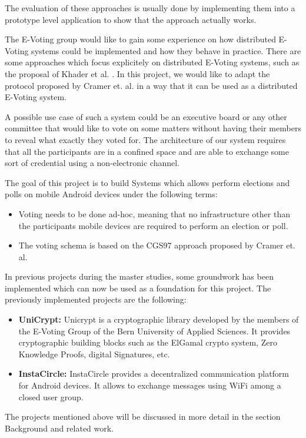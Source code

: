 \documentclass[numbers=noenddot, abstract=on]{scrreprt}
\begin{document}
The evaluation of these approaches is usually done by implementing them into a
prototype level application to show that the approach actually works.

The E-Voting group would like to gain some experience on how distributed
E-Voting systems could be implemented and how they behave in practice. There are
some approaches which focus explicitely on distributed E-Voting systems, such as
the proposal of Khader et al. \cite{HKRS12}. In this project, we would like to
adapt the protocol proposed by Cramer et. al. \cite{CGS97} in a way that it can
be used as a distributed E-Voting system.

A possible use case of such a system could be an executive board or any other
committee that would like to vote on some matters without having their members
to reveal what exactly they voted for. The architecture of our system requires
that all the participants are in a confined space and are able to exchange some
sort of credential using a non-electronic channel.

The goal of this project is to build Systems which allows perform elections and
polls on mobile Android devices under the following terms:
\begin{itemize}
  \item Voting needs to be done ad-hoc, meaning that no infrastructure other
  than the participants mobile devices are required to perform an election or
  poll.
  \item The voting schema is based on the CGS97 approach proposed by Cramer et.
  al. \cite{CGS97}
\end{itemize}

In previous projects during the master studies, some groundwork has been
implemented which can now be used as a foundation for this project. The
previously implemented projects are the following:
\begin{itemize}
  \item \textbf{UniCrypt:} Unicrypt is a cryptographic library developed by the
  members of the E-Voting Group of the Bern University of Applied Sciences. It
  provides cryptographic building blocks such as the ElGamal crypto system, Zero
  Knowledge Proofs, digital Signatures, etc. 
  \item \textbf{InstaCircle: } InstaCircle provides a decentralized
  communication platform for Android devices. It allows to exchange messages
  using WiFi among a closed user group.
\end{itemize}
The projects mentioned above will be discussed in more detail in the section
Background and related work.
\end{document}
